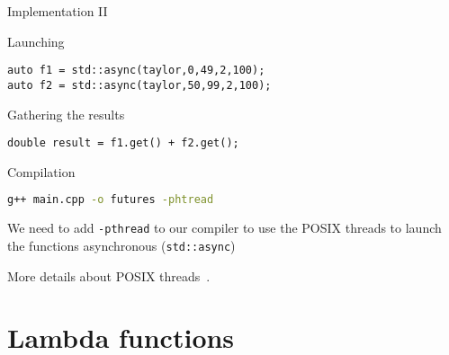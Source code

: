 \documentclass[\classoption]{beamer}
\begin{document}
\begin{frame}[fragile]{Implementation II}

\begin{block}{Launching}
\begin{lstlisting}
auto f1 = std::async(taylor,0,49,2,100); 
auto f2 = std::async(taylor,50,99,2,100); 
\end{lstlisting}
\end{block}

\begin{block}{Gathering the results}
\begin{lstlisting}
double result = f1.get() + f2.get();
\end{lstlisting}
\end{block}

\begin{block}{Compilation}
\begin{lstlisting}[language=bash]
g++ main.cpp -o futures -phtread
\end{lstlisting}
We need to add \lstinline|-pthread| to our compiler to use the POSIX threads to launch the functions asynchronous  (\lstinline|std::async|)
\end{block}
More details about POSIX threads~\cite{butenhof1997programming,kleiman1996programming}.
\end{frame}



\section{Lambda functions}
\end{document}
